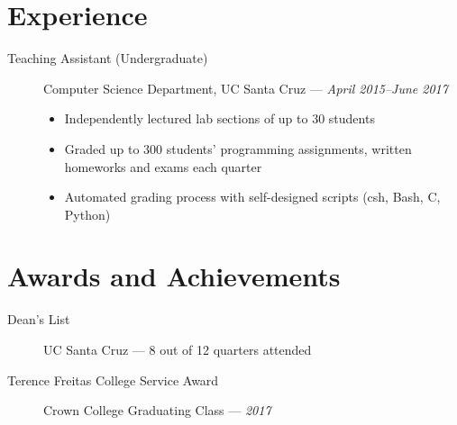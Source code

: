 \documentclass[10pt]{article}
\begin{document}
\section*{Experience}
\begin{description}
  \item[Teaching Assistant (Undergraduate)]
    Computer Science Department, UC Santa Cruz --- \textit{April 2015--June 2017}
    \begin{itemize}
    \item Independently lectured lab sections of up to $30$ students
    \item Graded up to $300$ students' programming assignments, written
      homeworks and exams each quarter
    \item Automated grading process with self-designed scripts (csh, Bash, C,
      Python)
  \end{itemize}
\end{description}

\section*{Awards and Achievements}
\begin{description}
  \item[Dean's List] UC Santa Cruz --- 8 out of 12 quarters attended
  \item[Terence Freitas College Service Award] Crown College Graduating Class --- \textit{2017}
\end{description}
\end{document}
